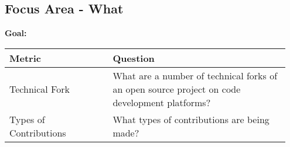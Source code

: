 
\subsection{Focus Area - What}
\textbf{Goal:} 
\begin{table}[ht!]
    \centering
    \begin{tabular}{|p{0.35\linewidth} | p{0.6\linewidth}|}
        \hline
        \hfil \textbf{Metric}  & \hfil \textbf{Question} \\
        \hline
		Technical Fork & What are a number of technical forks of an open source project on code development platforms? \\ 
		\hline
		Types of Contributions & What types of contributions are being made? \\ 
		\hline
    \end{tabular}
\end{table}

 
 
